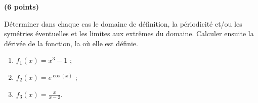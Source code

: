 \begin{exercice}\label{exoExosenvrac-0015}\textbf{ (6 points) }

Déterminer dans chaque cas le domaine de définition, la périodicité et/ou les symétries éventuelles et les limites aux extrêmes du domaine. Calculer ensuite la dérivée de la fonction, la où elle est définie.       
    \begin{enumerate}
    \item $\displaystyle f_1(x)= x^3-1$ ;
    \item $\displaystyle f_2(x)= e^{\cos(x)}$ ;
    \item $\displaystyle f_3(x)= \frac{x}{x-2}$. 
    \end{enumerate}

\end{exercice}
